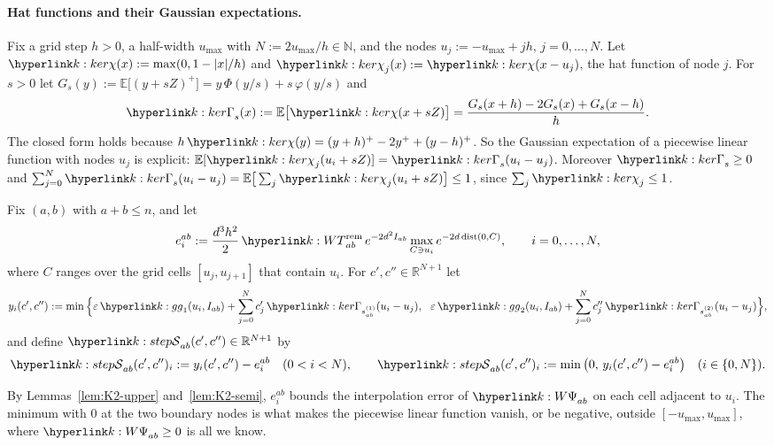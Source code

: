 \documentclass[11pt]{article}
\newcommand{\dt}[1]{\hypertarget{#1}{}}
\newcommand{\R}{\mathbb{R}}
\newcommand{\Nat}{\mathbb{N}}
\newcommand{\E}{\mathbb{E}}
\newcommand{\1}{\mathbf{1}}
\begin{document}
\paragraph{Hat functions and their Gaussian expectations.}\dt{k:ker} Fix a grid step $h>0$, a half-width $u_{\max}$ with $N:=2u_{\max}/h\in\Nat$, and the nodes
$u_j:=-u_{\max}+jh$, $j=0,\dots,N$. Let $\kchi(x):=\max(0,1-|x|/h)$ and $\kchi_j(x):=\kchi(x-u_j)$, the hat function of node $j$. For $s>0$ let
$G_s(y):=\E\big[(y+sZ)^+\big]=y\,\Phi(y/s)+s\,\varphi(y/s)$ and
\[
\kGam_s(x):=\E\big[\kchi(x+sZ)\big]=\frac{G_s(x+h)-2G_s(x)+G_s(x-h)}{h}.
\]
The closed form holds because $h\,\kchi(y)=(y+h)^+-2y^++(y-h)^+$. So the Gaussian expectation of a piecewise linear function with nodes $u_j$ is explicit:
$\E[\kchi_j(u_i+sZ)]=\kGam_s(u_i-u_j)$. Moreover $\kGam_s\ge0$ and $\sum_{j=0}^N\kGam_s(u_i-u_j)=\E\big[\sum_j\kchi_j(u_i+sZ)\big]\le1$, since $\sum_j\kchi_j\le1$.

\begin{definition}\label{def:K2-step}\dt{k:step}
Fix $(a,b)$ with $a+b\le n$, and let
\[
e^{ab}_i:=\frac{d^3h^2}{2}\,\kT_{ab}\,e^{-2d^2I_{ab}}\max_{C\ni u_i}e^{-2d\,\mathrm{dist}(0,C)},\qquad i=0,\dots,N,
\]
where $C$ ranges over the grid cells $[u_j,u_{j+1}]$ that contain $u_i$. For $c',c''\in\R^{N+1}$ let
\[
y_i(c',c''):=\min\Big\{\varepsilon\,\kg_1(u_i,I_{ab})+\sum_{j=0}^Nc'_j\,\kGam_{s^{(1)}_{ab}}(u_i-u_j),\ \ \varepsilon\,\kg_2(u_i,I_{ab})+\sum_{j=0}^Nc''_j\,\kGam_{s^{(2)}_{ab}}(u_i-u_j)\Big\},
\]
and define $\kS_{ab}(c',c'')\in\R^{N+1}$ by
\[
\kS_{ab}(c',c'')_i:=y_i(c',c'')-e^{ab}_i\quad(0<i<N),\qquad \kS_{ab}(c',c'')_i:=\min\big(0,\,y_i(c',c'')-e^{ab}_i\big)\quad(i\in\{0,N\}).
\]
\end{definition}

\noindent By Lemmas~\ref{lem:K2-upper} and~\ref{lem:K2-semi}, $e^{ab}_i$ bounds the interpolation error of $\kW_{ab}$ on each cell adjacent to $u_i$. The minimum with $0$ at the
two boundary nodes is what makes the piecewise linear function vanish, or be negative, outside $[-u_{\max},u_{\max}]$, where $\kW_{ab}\ge0$ is all we know.
\end{document}
